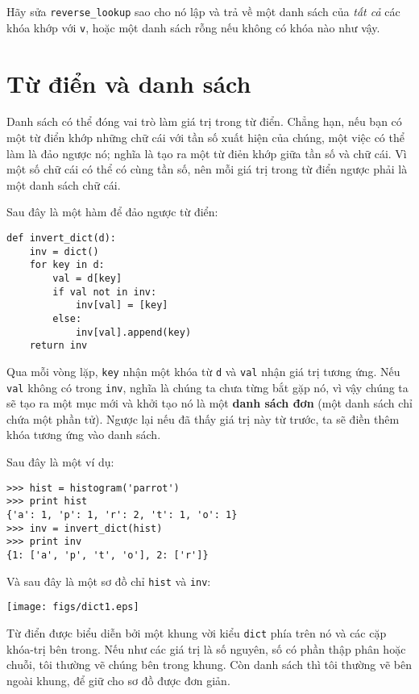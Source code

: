 \documentclass[11pt]{book}
\begin{document}
\begin{ex}
Hãy sửa \verb"reverse_lookup" sao cho nó lập và trả về một danh sách
của {\em tất cả} các khóa khớp với {\tt v}, hoặc một danh sách rỗng
nếu không có khóa nào như vậy.
\end{ex}


\section{Từ điển và danh sách}

Danh sách có thể đóng vai trò làm giá trị trong từ điển. Chẳng hạn,
nếu bạn có một từ điển khớp những chữ cái với tần số xuất hiện của 
chúng, một việc có thể làm là đảo ngược nó; nghĩa là tạo ra một từ điẻn
khớp giữa tần số và chữ cái. Vì một số chữ cái có thể có cùng tần số,
nên mỗi giá trị trong từ điển ngược phải là một danh sách chữ cái.


Sau đây là một hàm để đảo ngược từ điển:

\beforeverb
\begin{verbatim}
def invert_dict(d):
    inv = dict()
    for key in d:
        val = d[key]
        if val not in inv:
            inv[val] = [key]
        else:
            inv[val].append(key)
    return inv
\end{verbatim}
\afterverb
%
Qua mỗi vòng lặp, {\tt key} nhận một khóa từ {\tt d} và 
{\tt val} nhận giá trị tương ứng. Nếu {\tt val} không có trong {\tt inv},
nghĩa là chúng ta chưa từng bắt gặp nó, vì vậy chúng ta sẽ tạo ra
một mục mới và khởi tạo nó là một {\bf danh sách đơn} (một danh sách
chỉ chứa một phần tử). Ngược lại nếu đã thấy giá trị này từ trước, ta
sẽ điền thêm khóa tương ứng vào danh sách.


Sau đây là một ví dụ:

\beforeverb
\begin{verbatim}
>>> hist = histogram('parrot')
>>> print hist
{'a': 1, 'p': 1, 'r': 2, 't': 1, 'o': 1}
>>> inv = invert_dict(hist)
>>> print inv
{1: ['a', 'p', 't', 'o'], 2: ['r']}
\end{verbatim}
\afterverb
%
Và sau đây là một sơ đồ chỉ {\tt hist} và {\tt inv}:


\beforefig
\centerline{\texttt{[image: figs/dict1.eps]}}
\afterfig

Từ điển được biểu diễn bởi một khung vời kiểu {\tt dict} phía trên nó
và các cặp khóa-trị bên trong. Nếu như các giá trị là số nguyên, số
có phần thập phân hoặc chuỗi, tôi thường vẽ chúng bên trong khung. Còn
danh sách thì tôi thường vẽ bên ngoài khung, để giữ cho sơ đồ được 
đơn giản.
\end{document}
